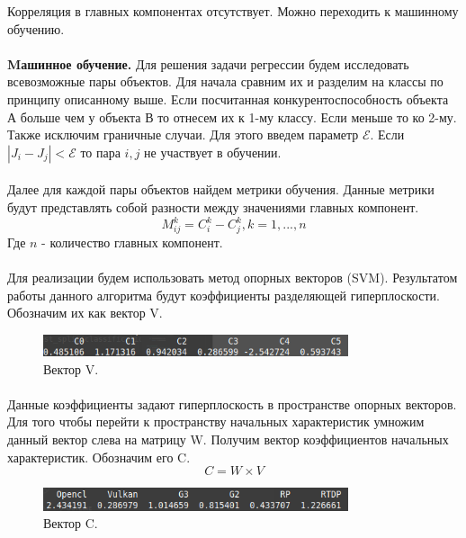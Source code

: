\documentclass[14pt, a4paper]{extarticle}
\begin{document}
Корреляция в главных компонентах отсутствует. Можно переходить к машинному обучению.
\paragraph{}

\textbf{Mашинное обучение.} Для решения задачи регрессии будем исследовать всевозможные пары объектов. Для начала сравним их и разделим на классы по принципу описанному выше. Если посчитанная конкурентоспособность объекта А больше чем у объекта В то отнесем их к 1-му классу. Если меньше то ко 2-му.
Также исключим граничные случаи. Для этого введем параметр \(\mathcal{E}\). Если \(\left|J_i - J_j\right| < \mathcal{E}\) то пара \(i, j\)
не участвует в обучении. 
\newpage
\paragraph{}
Далее для каждой пары объектов найдем метрики обучения. Данные метрики будут представлять собой разности между значениями главных компонент.
\[
  M^k_{ij} = C_{i}^{k} - C_{j}^{k},  k = 1, ... , n
\]
Где \(n\) - количество главных компонент.
\paragraph{}
Для реализации будем использовать метод опорных векторов (SVM). Результатом работы данного алгоритма будут коэффициенты разделяющей гиперплоскости. Обозначим их как вектор V. 
\begin{figure}[h]
  \centering
  \includegraphics[width=0.8\textwidth]{./img/linear/vectorv.png}
  \caption{Вектор V.}
  \label{fig:example}
\end{figure}
\paragraph{}
Данные коэффициенты задают гиперплоскость в пространстве опорных векторов. Для того чтобы перейти к пространству начальных характеристик умножим данный вектор слева на матрицу W.
Получим вектор коэффициентов начальных характеристик. Обозначим его C.
\[
  C = W \times V
\]
\begin{figure}[h]
  \centering
  \includegraphics[width=0.8\textwidth]{./img/linear/vectorc.png}
  \caption{Вектор C.}
  \label{fig:example}
\end{figure}
\end{document}
